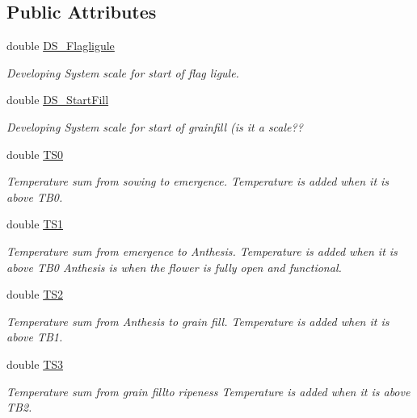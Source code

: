 \subsection*{Public Attributes}
\begin{DoxyCompactItemize}
\item 
double \hyperlink{classphenology_a98fc64c780c7b1bd3ce4888a49d16dd2}{DS\_\-Flagligule}
\begin{DoxyCompactList}\small\item\em Developing System scale for start of flag ligule. \item\end{DoxyCompactList}\item 
double \hyperlink{classphenology_aea2f0be3503256d007d5b1ee391e98e0}{DS\_\-StartFill}
\begin{DoxyCompactList}\small\item\em Developing System scale for start of grainfill (is it a scale?? \item\end{DoxyCompactList}\item 
double \hyperlink{classphenology_a8073c2ccadc82c47d32973c4c8b6bce9}{TS0}
\begin{DoxyCompactList}\small\item\em Temperature sum from sowing to emergence. Temperature is added when it is above TB0. \item\end{DoxyCompactList}\item 
double \hyperlink{classphenology_a85182e67e41bcb74aaa61a5f81874e77}{TS1}
\begin{DoxyCompactList}\small\item\em Temperature sum from emergence to Anthesis. Temperature is added when it is above TB0 Anthesis is when the flower is fully open and functional. \item\end{DoxyCompactList}\item 
double \hyperlink{classphenology_a40890cc0269344ac78c0d3f0e09db107}{TS2}
\begin{DoxyCompactList}\small\item\em Temperature sum from Anthesis to grain fill. Temperature is added when it is above TB1. \item\end{DoxyCompactList}\item 
double \hyperlink{classphenology_afd6b3084c34fa451055bebb7300a23a3}{TS3}
\begin{DoxyCompactList}\small\item\em Temperature sum from grain fillto ripeness Temperature is added when it is above TB2. \item\end{DoxyCompactList}\item 

\end{DoxyCompactItemize}
